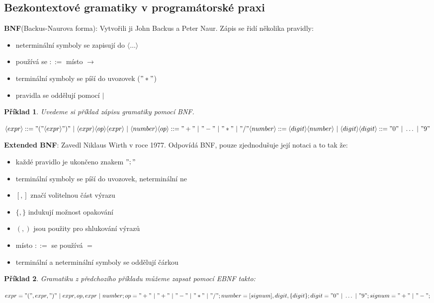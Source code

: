 \documentclass[10pt, a4paper, titlepage]{article}
\theoremstyle{note}
\newtheorem{priklad}{\textbf{Příklad}}
\begin{document}
\subsection{Bezkontextové gramatiky v programátorské praxi}

\textbf{BNF}(Backus-Naurova forma):
Vytvořili ji John Backus a Peter Naur. Zápis se řidí několika pravidly:
\begin{itemize}
\item
neterminální symboly se zapisují do $\langle \ldots \rangle$
\item
používá se $::=$ místo $\rightarrow$
\item
terminální symboly se píší do uvozovek ($"*"$)
\item
pravidla se oddělují pomocí $|$
\end{itemize}

\begin{priklad}
Uvedeme si příklad zápisu gramatiky pomocí BNF.

$\langle expr \rangle ::= "(" \langle expr \rangle ")"\ |\ \langle expr \rangle\langle op \rangle\langle expr \rangle\ |\ \langle number \rangle \\
\langle op \rangle ::= "+"\ |\ "-"\ |\ "*"\ |\ "/" \\
\langle number \rangle ::= \langle digit \rangle \langle number \rangle\ |\ \langle digit \rangle \\
\langle digit \rangle ::= "0"\ |\ \ldots\ |\ "9"$
\end{priklad}

\textbf{Extended BNF}: Zavedl Niklaus Wirth v roce 1977. Odpovídá BNF, pouze zjednodušuje její notaci a to tak že:
\begin{itemize}
\item
každé pravidlo je ukončeno znakem $";"$
\item
terminální symboly se píší do uvozovek, neterminální ne
\item
$[,]$ značí volitelnou část výrazu
\item
$\lbrace,\rbrace$ indukují možnost opakování
\item
$(,)$ jsou použity pro shlukování výrazů
\item
místo $::=$ se používá $=$
\item
terminální a neterminální symboly se oddělují čárkou
\end{itemize}

\begin{priklad}
Gramatiku z předchozího příkladu můžeme zapsat pomocí EBNF takto:

$expr="(",expr,")"\ |\ expr,op,expr\ |\ number;\\
op="+"\ |\ "+"\ |\ "-"\ |\ "*"\ |\ "/";\\
number=[signum],digit,\lbrace digit \rbrace;\\
digit="0"\ |\ \ldots \ |\ "9";\\
signum="+"\ |\ "-";$
\end{priklad}
\end{document}
